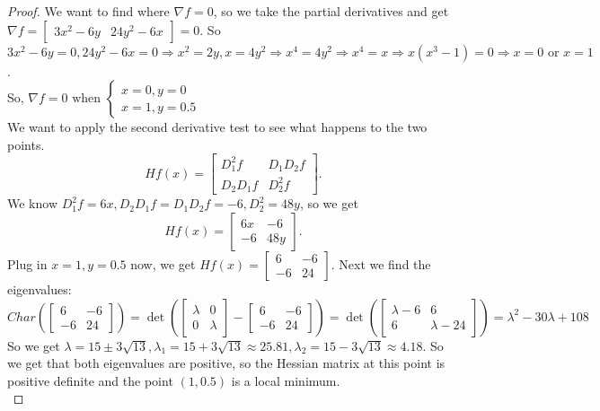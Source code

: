 \documentclass{article}
\begin{document}
 \begin{proof}
     We want to find where $\nabla f=0$, so we take the partial derivatives and get $\nabla f =\begin{bmatrix}
         3x^2-6y & 24y^2-6x
     \end{bmatrix}=0. $ So $ 3x^2-6y=0, 24y^2-6x=0 \Rightarrow x^2=2y, x=4y^2 \Rightarrow x^4=4y^2 \Rightarrow x^4=x \Rightarrow x(x^3-1)=0 \Rightarrow x = 0 \text{ or } x=1$. \\
     So, $\nabla f =0 \text{ when }\begin{cases}
         x =0, y=0 \\
         x = 1, y = 0.5
     \end{cases}$ \\
     We want to apply the second derivative test to see what happens to the two points. \\
     $$Hf(x)=\begin{bmatrix}
         D_1^2f & D_1D_2f \\
         D_2D_1f & D_2^2f
     \end{bmatrix}.$$
    We know $D_1^2f=6x, D_2D_1f=D_1D_2f=-6, D_2^2=48y$, so we get\\
         $$Hf(x)=\begin{bmatrix}
         6x  & -6 \\
         -6 & 48y
     \end{bmatrix}.$$
    Plug in $x=1, y=0.5$ now, we get 
        $Hf(x)=\begin{bmatrix}
         6 & -6 \\
         -6 & 24
     \end{bmatrix}.$ Next we find the eigenvalues:         $$Char(\begin{bmatrix}
         6 & -6 \\
         -6 & 24
     \end{bmatrix})= \det(\begin{bmatrix}
         \lambda & 0 \\
         0 & \lambda
     \end{bmatrix} - \begin{bmatrix}
         6 & -6 \\
         -6 & 24 
    \end{bmatrix})= \det(\begin{bmatrix}
         \lambda - 6 & 6 \\
         6 & \lambda -24 
    \end{bmatrix})=\lambda^2-30\lambda +108
         $$
    So we get $\lambda = 15 \pm 3\sqrt{13}, \lambda_1=15 + 3\sqrt{13} \approx 25.81, \lambda_2= 15 - 3\sqrt{13} \approx 4.18$. So we get that both eigenvalues are positive, so the Hessian matrix at this point is positive definite and the point $(1,0.5)$ is a local minimum.  \\

\end{proof}
\end{document}
